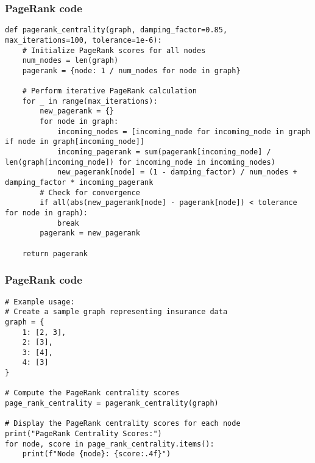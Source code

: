 \begin{frame}[fragile]\frametitle{PageRank code}

\begin{lstlisting}[basicstyle=\tiny]
def pagerank_centrality(graph, damping_factor=0.85, max_iterations=100, tolerance=1e-6):
    # Initialize PageRank scores for all nodes
    num_nodes = len(graph)
    pagerank = {node: 1 / num_nodes for node in graph}

    # Perform iterative PageRank calculation
    for _ in range(max_iterations):
        new_pagerank = {}
        for node in graph:
            incoming_nodes = [incoming_node for incoming_node in graph if node in graph[incoming_node]]
            incoming_pagerank = sum(pagerank[incoming_node] / len(graph[incoming_node]) for incoming_node in incoming_nodes)
            new_pagerank[node] = (1 - damping_factor) / num_nodes + damping_factor * incoming_pagerank
        # Check for convergence
        if all(abs(new_pagerank[node] - pagerank[node]) < tolerance for node in graph):
            break
        pagerank = new_pagerank
		
    return pagerank

\end{lstlisting}


\end{frame}


\begin{frame}[fragile]\frametitle{PageRank code}

\begin{lstlisting}[basicstyle=\tiny]
# Example usage:
# Create a sample graph representing insurance data
graph = {
    1: [2, 3],
    2: [3],
    3: [4],
    4: [3]
}

# Compute the PageRank centrality scores
page_rank_centrality = pagerank_centrality(graph)

# Display the PageRank centrality scores for each node
print("PageRank Centrality Scores:")
for node, score in page_rank_centrality.items():
    print(f"Node {node}: {score:.4f}")

\end{lstlisting}


\end{frame}


